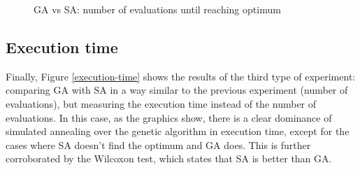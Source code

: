 \documentclass{article}[12pt]
\begin{document}
	\begin{figure}
		\newline
		\caption{GA vs SA: number of evaluations until reaching optimum}
		\label{num-evaluations}
	\end{figure}
	
	\subsection{Execution time}
	
	Finally, Figure \ref{execution-time} shows the results of the third type of experiment: comparing GA with SA in a way similar to the previous experiment (number of evaluations), but measuring the execution time instead of the number of evaluations.
	\bigbreak
	In this case, as the graphics show, there is a clear dominance of simulated annealing over the genetic algorithm in execution time, except for the cases where SA doesn't find the optimum and GA does. This is further corroborated by the Wilcoxon test, which states that SA is better than GA.
	
\end{document}
